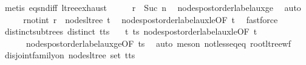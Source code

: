 \begin{isabellebody}
\ {\isacharparenleft}{\kern0pt}metis\ eq{\isacharunderscore}{\kern0pt}snd{\isacharunderscore}{\kern0pt}iff\ ltree{\isachardot}{\kern0pt}exhaust{\isacharparenright}{\kern0pt}\isanewline
\ \ \isamarkupfalse%
\ \isamarkupfalse%
\ {\isachardoublequoteopen}r\ {\isasymge}\ Suc\ n{\isacharprime}{\kern0pt}{\isachardoublequoteclose}\ \isamarkupfalse%
\ nodes{\isacharunderscore}{\kern0pt}postorder{\isacharunderscore}{\kern0pt}label{\isacharunderscore}{\kern0pt}aux{\isacharunderscore}{\kern0pt}ge\ \isamarkupfalse%
\ auto\isanewline
\ \ \isamarkupfalse%
\ \isamarkupfalse%
\ r{\isacharunderscore}{\kern0pt}notin{\isacharunderscore}{\kern0pt}t{\isacharprime}{\kern0pt}{\isacharcolon}{\kern0pt}\ {\isachardoublequoteopen}r\ {\isasymnotin}\ nodes{\isacharunderscore}{\kern0pt}ltree\ t{\isacharprime}{\kern0pt}{\isachardoublequoteclose}\ \isamarkupfalse%
\ nodes{\isacharunderscore}{\kern0pt}postorder{\isacharunderscore}{\kern0pt}label{\isacharunderscore}{\kern0pt}aux{\isacharunderscore}{\kern0pt}le{\isacharbrackleft}{\kern0pt}OF\ t{\isacharprime}{\kern0pt}{\isacharbrackright}{\kern0pt}\ \isamarkupfalse%
\ fastforce\isanewline
\ \ \isamarkupfalse%
\ distinct{\isacharunderscore}{\kern0pt}subtrees{\isacharcolon}{\kern0pt}\ {\isachardoublequoteopen}distinct\ {\isacharparenleft}{\kern0pt}t{\isacharprime}{\kern0pt}{\isacharhash}{\kern0pt}ts{\isacharprime}{\kern0pt}{\isacharparenright}{\kern0pt}{\isachardoublequoteclose}\ \isamarkupfalse%
\ {}\ t{\isacharprime}{\kern0pt}\ ts{\isacharprime}{\kern0pt}\ nodes{\isacharunderscore}{\kern0pt}postorder{\isacharunderscore}{\kern0pt}label{\isacharunderscore}{\kern0pt}aux{\isacharunderscore}{\kern0pt}le{\isacharbrackleft}{\kern0pt}OF\ t{\isacharprime}{\kern0pt}{\isacharbrackright}{\kern0pt}\isanewline
\ \ \ \ \ \ nodes{\isacharunderscore}{\kern0pt}postorder{\isacharunderscore}{\kern0pt}label{\isacharunderscore}{\kern0pt}aux{\isacharunderscore}{\kern0pt}ge{\isacharbrackleft}{\kern0pt}OF\ ts{\isacharprime}{\kern0pt}{\isacharbrackright}{\kern0pt}\ \isamarkupfalse%
\ {\isacharparenleft}{\kern0pt}auto{\isacharcomma}{\kern0pt}\ meson\ not{\isacharunderscore}{\kern0pt}less{\isacharunderscore}{\kern0pt}eq{\isacharunderscore}{\kern0pt}eq\ root{\isacharunderscore}{\kern0pt}ltree{\isacharunderscore}{\kern0pt}wf{\isacharparenright}{\kern0pt}\isanewline
\ \ \isamarkupfalse%
\ {\isachardoublequoteopen}disjoint{\isacharunderscore}{\kern0pt}family{\isacharunderscore}{\kern0pt}on\ nodes{\isacharunderscore}{\kern0pt}ltree\ {\isacharparenleft}{\kern0pt}set\ {\isacharparenleft}{\kern0pt}t{\isacharprime}{\kern0pt}{\isacharhash}{\kern0pt}ts{\isacharprime}{\kern0pt}{\isacharparenright}{\kern0pt}{\isacharparenright}{\kern0pt}{\isachardoublequoteclose}\ \isamarkupfalse%

\end{isabellebody}
